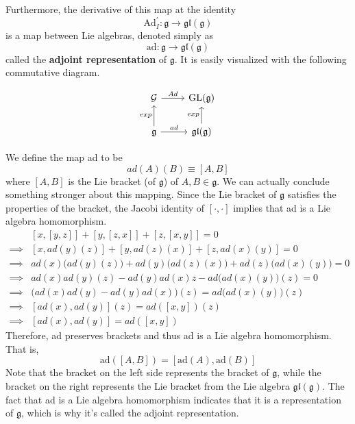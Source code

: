   \begin{definition}
    Furthermore, the derivative of this map at the identity 
    \begin{equation}
      \text{Ad}_I^\prime: \mathfrak{g} \longrightarrow \mathfrak{gl}(\mathfrak{g})
    \end{equation}
    is a map between Lie algebras, denoted simply as 
    \begin{equation}
      \text{ad}: \mathfrak{g} \longrightarrow \mathfrak{gl}(\mathfrak{g})
    \end{equation}
    called the \textbf{adjoint representation} of $\mathfrak{g}$. It is easily visualized with the following commutative diagram. 

    \[\begin{tikzcd}
    \mathcal{G} \arrow{r}{Ad} & \GL(\mathfrak{g}) \\
    \mathfrak{g} \arrow{u}{exp} \arrow{r}{ad} & \mathfrak{gl}(\mathfrak{g}) \arrow{u}{exp}
    \end{tikzcd}\]

    We define the map ad to be 
    \begin{equation}
      ad(A)(B) \equiv [A,B]
    \end{equation}
    where $[A,B]$ is the Lie bracket (of $\mathfrak{g}$) of $A, B \in \mathfrak{g}$. We can actually conclude something stronger about this mapping. Since the Lie bracket of $\mathfrak{g}$ satisfies the properties of the bracket, the Jacobi identity of $[\cdot, \cdot]$ implies that ad is a Lie algebra homomorphism. 
    \begin{align*}
      & [x, [y,z]] + [y,[z,x]] + [z, [x,y]] = 0 \\
      \implies & [x, ad(y)(z)] + [y, ad(z)(x)] + [z, ad(x)(y)] = 0 \\
      \implies & ad(x)\big(ad(y)(z)\big) + ad(y) \big( ad(z)(x)\big) + ad(z) \big(ad(x)(y)\big) = 0 \\
      \implies & ad(x) ad(y) (z) - ad(y) ad(x) z - ad \big(ad(x)(y)\big) (z) = 0 \\
      \implies & \big( ad(x) ad(y) - ad(y) ad(x) \big) (z) = ad\big( ad(x)(y) \big) (z) \\
      \implies & [ad(x), ad(y)] (z) = ad ([x,y]) (z) \\
      \implies & [ad(x), ad(y)] = ad([x,y])
    \end{align*}
    Therefore, ad preserves brackets and thus ad is a Lie algebra homomorphism. That is, 
    \begin{equation}
      \text{ad}([A,B]) = [\text{ad}(A), \text{ad}(B)]
    \end{equation}
    Note that the bracket on the left side represents the bracket of $\mathfrak{g}$, while the bracket on the right represents the Lie bracket from the Lie algebra $\mathfrak{gl}(\mathfrak{g})$. The fact that ad is a Lie algebra homomorphism indicates that it is a representation of $\mathfrak{g}$, which is why it's called the adjoint representation. 
  \end{definition}

